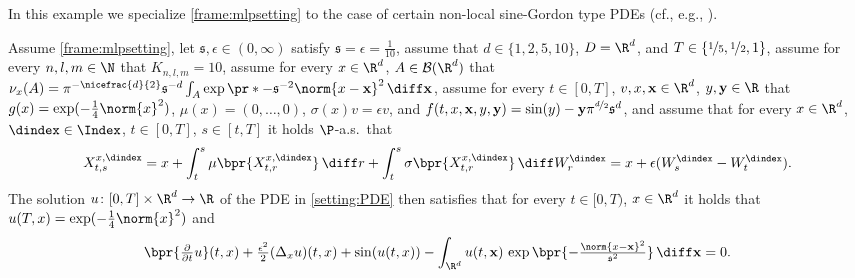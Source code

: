 \begin{example}

	\label{exampleMLP:sinegordon_nonlocal}
	In this example we specialize \cref{frame:mlpsetting} to the case of certain non-local sine-Gordon type PDEs (cf., e.g., \cite{Hairer2016,Barone1971,Coleman1994}).

	Assume 
		\cref{frame:mlpsetting},
	let
		$\mathfrak s,\epsilon\in(0,\infty)$
	satisfy 
		$\mathfrak{s} = \epsilon = \tfrac{1}{10}$,
	assume that
		$d\in\{1,2,5,10\}$,
		$D = \R^d$, 
		and	$T\in\{\nicefrac{1}{5},\nicefrac{1}{2},1\}$,
	assume for every 
		$n,l,m\in \N$ 
	that
		$K_{n,l,m} = 10$,
	assume for every
		$x \in \R^d$,
		$A \in \mathcal{B}(\R^d)$
	that
		$\nu_x(A) = \pi^{-\nicefrac{d}{2}}\mathfrak{s}^{-d}\int_A \exp\pr*{-\mathfrak{s}^{-2}\norm{x - \mathbf{x}}^2}\,\diff\mathbf{x}$,
	assume for every 
		$t \in [0,T]$,
		$v,x,\mathbf{x} \in \R^d$,
		$y,\mathbf{y} \in \R$
	that
		$g(x)= \exp (- \tfrac{1}{4}\norm{x}^2)$,
		$\mu(x)=(0,\dots,0)$,
		$\sigma(x) v = \epsilon v$, and
		$f(t,x,\mathbf{x},y,\mathbf{y})= \sin(y) -\mathbf{y}\pi^{\nicefrac{d}{2}}\mathfrak{s}^d$,
	and	assume that for every 
		$x\in \R^{d}$, 
		$\dindex \in \Index$, 
		$t\in [0,T]$, 
		$s\in [t,T]$ 
	it holds $\P$-a.s.\ that
	\begin{equation}
		X^{x,\dindex}_{t,s} 
		= 
		x + \int_{t}^{s} \mu\bpr{X^{x,\dindex}_{t,r}} \, \diff r + \int^{s}_{t} \sigma \bpr{X^{x,\dindex}_{t,r}} \, \diff W^{\dindex}_{r}
		=
		x+\epsilon(W^\dindex_s-W^\dindex_t)
		.
	\end{equation}
	The solution 
		$u\colon[0,T]\times \R^d \to \R$ 
		of the PDE in \eqref{setting:PDE} then satisfies that for every
			$t\in [0,T)$, 
			$x\in\R^d$
		it holds that
			$u(T,x) = \exp (-\tfrac{1}{4}\norm{x}^2)$ and
		\begin{equation}
			\label{eqMLP:sinegordon_nonlocal}
			\bpr{\tfrac{\partial}{\partial t}u}(t,x)
			+
			\tfrac{\epsilon^2}{2}(\Delta_x u)(t,x) 
			+ 
			\sin ( u(t,x) ) 
			- 
			\int_{\R^d} u(t,\mathbf{x})\, \exp\bpr{-\tfrac{\norm{x-\mathbf{x}}^2}{\mathfrak{s}^2}}\,\diff \mathbf{x} 
			=
			0
			.
		\end{equation}
\end{example}

